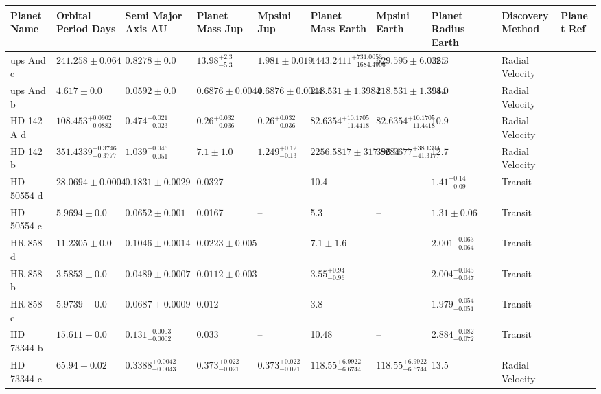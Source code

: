 \begin{tabular}{llllllllll}
\toprule
Planet Name & Orbital Period Days & Semi Major Axis AU & Planet Mass Jup & Mpsini Jup & Planet Mass Earth & Mpsini Earth & Planet Radius Earth & Discovery Method & Planet Ref \\
\midrule
ups And c & $241.258 \pm 0.064$ & $0.8278 \pm 0.0$ & $13.98^{+2.3}_{-5.3}$ & $1.981 \pm 0.019$ & $4443.2411^{+731.0053}_{-1684.4906}$ & $629.595 \pm 6.0385$ & 12.3 & Radial Velocity & \cite{CURIEL_ET_AL__2011} \\
ups And b & $4.617 \pm 0.0$ & $0.0592 \pm 0.0$ & $0.6876 \pm 0.0044$ & $0.6876 \pm 0.0044$ & $218.531 \pm 1.3984$ & $218.531 \pm 1.3984$ & 14.0 & Radial Velocity & \cite{CURIEL_ET_AL__2011} \\
HD 142 A d & $108.453^{+0.0902}_{-0.0882}$ & $0.474^{+0.021}_{-0.023}$ & $0.26^{+0.032}_{-0.036}$ & $0.26^{+0.032}_{-0.036}$ & $82.6354^{+10.1705}_{-11.4418}$ & $82.6354^{+10.1705}_{-11.4418}$ & 10.9 & Radial Velocity & \cite{FENG_ET_AL__2022} \\
HD 142 b & $351.4339^{+0.3746}_{-0.3777}$ & $1.039^{+0.046}_{-0.051}$ & $7.1 \pm 1.0$ & $1.249^{+0.12}_{-0.13}$ & $2256.5817 \pm 317.8284$ & $396.9677^{+38.1394}_{-41.3177}$ & 12.7 & Radial Velocity & \cite{FENG_ET_AL__2022} \\
HD 50554 d & $28.0694 \pm 0.0004$ & $0.1831 \pm 0.0029$ & 0.0327 & -- & 10.4 & -- & $1.41^{+0.14}_{-0.09}$ & Transit & \cite{LIU_ET_AL_2026} \\
HD 50554 c & $5.9694 \pm 0.0$ & $0.0652 \pm 0.001$ & 0.0167 & -- & 5.3 & -- & $1.31 \pm 0.06$ & Transit & \cite{LIU_ET_AL_2026} \\
HR 858 d & $11.2305 \pm 0.0$ & $0.1046 \pm 0.0014$ & $0.0223 \pm 0.005$ & -- & $7.1 \pm 1.6$ & -- & $2.001^{+0.063}_{-0.064}$ & Transit & \cite{BONFANTI_ET_AL__2025} \\
HR 858 b & $3.5853 \pm 0.0$ & $0.0489 \pm 0.0007$ & $0.0112 \pm 0.003$ & -- & $3.55^{+0.94}_{-0.96}$ & -- & $2.004^{+0.045}_{-0.047}$ & Transit & \cite{BONFANTI_ET_AL__2025} \\
HR 858 c & $5.9739 \pm 0.0$ & $0.0687 \pm 0.0009$ & 0.012 & -- & 3.8 & -- & $1.979^{+0.054}_{-0.051}$ & Transit & \cite{BONFANTI_ET_AL__2025} \\
HD 73344 b & $15.611 \pm 0.0$ & $0.131^{+0.0003}_{-0.0002}$ & 0.033 & -- & 10.48 & -- & $2.884^{+0.082}_{-0.072}$ & Transit & \cite{SULIS_ET_AL_2024} \\
HD 73344 c & $65.94 \pm 0.02$ & $0.3388^{+0.0042}_{-0.0043}$ & $0.373^{+0.022}_{-0.021}$ & $0.373^{+0.022}_{-0.021}$ & $118.55^{+6.9922}_{-6.6744}$ & $118.55^{+6.9922}_{-6.6744}$ & 13.5 & Radial Velocity & \cite{ZHANG_ET_AL_2025} \\

\end{tabular}
